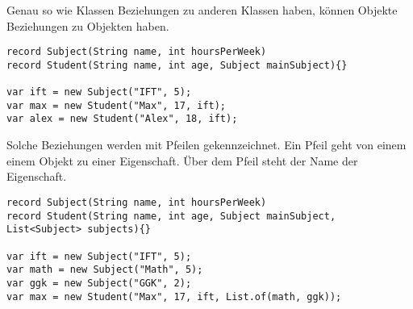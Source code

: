 \documentclass[a4paper]{scrartcl}
\begin{document}
Genau so wie Klassen Beziehungen zu anderen Klassen haben, können Objekte Beziehungen zu Objekten haben.
\begin{verbatim}
record Subject(String name, int hoursPerWeek)
record Student(String name, int age, Subject mainSubject){}

var ift = new Subject("IFT", 5);
var max = new Student("Max", 17, ift);
var alex = new Student("Alex", 18, ift);
\end{verbatim}
Solche Beziehungen werden mit Pfeilen gekennzeichnet. 
Ein Pfeil geht von einem einem Objekt zu einer Eigenschaft.
Über dem Pfeil steht der Name der Eigenschaft.



\newpage

\begin{verbatim}
record Subject(String name, int hoursPerWeek)
record Student(String name, int age, Subject mainSubject, List<Subject> subjects){}

var ift = new Subject("IFT", 5);
var math = new Subject("Math", 5);
var ggk = new Subject("GGK", 2);
var max = new Student("Max", 17, ift, List.of(math, ggk));
\end{verbatim}
\end{document}
